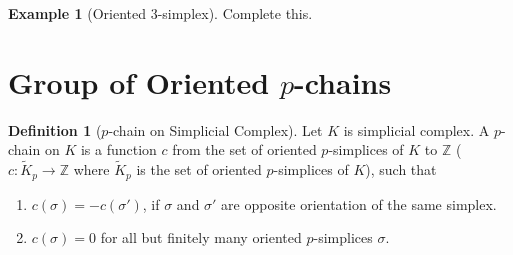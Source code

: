 \documentclass[12pt,oneside,reqno]{amsart}
\theoremstyle{plain}
\theoremstyle{definition}
\newtheorem{example}{Example}[section]
\newtheorem{definition}[theorem]{Definition}
\theoremstyle{remark}
\newcommand{\mbb}[1]{\mathbb{#1}}
\newcommand{\0}{{\textbf{0}}}
\begin{document}
\begin{example}[Oriented 3-simplex]\label{eg:Oriented 3-simplex}
Complete this.
\end{example}

\section{Group of Oriented $p$-chains}\label{s:Group of Oriented p chains}
\begin{definition}[$p$-chain on Simplicial Complex]\label{d:p chain on Simplicial Complex}
Let $K$ is simplicial complex. A $p$-chain on $K$ is a function $c$ from the set of oriented $p$-simplices of $K$ to $\mbb{Z}$  ($c\colon \widetilde{K}_p \longrightarrow \mathbb{Z}$ where $\widetilde{K}_p$ is the set of oriented $p$-simplices of $K$), such that 
\begin{enumerate}
\item $c(\sigma) = -c(\sigma')$, if $\sigma$ and $\sigma'$ are opposite orientation of the same simplex.
\item $c(\sigma) = 0$ for all but finitely many oriented $p$-simplices $\sigma$.
\end{enumerate}    
\end{definition}
\end{document}
